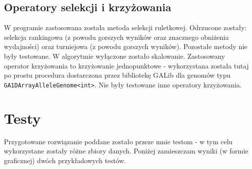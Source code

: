 \documentclass[11pt,a4paper,oneside]{article}
\begin{document}
\subsection{Operatory selekcji i krzyżowania}
W programie zastosowana została metoda selekcji ruletkowej. Odrzucone zostały: selekcja rankingowa (z powodu gorszych wyników oraz znacznego obniżenia wydajności) oraz turniejowa (z powodu gorszych wyników). Pozostałe metody nie były testowane. W algorytmie wyłączone zostało skalowanie. Zastosowany operator krzyżowania to krzyżowanie jednopunktowe - wykorzystana została tutaj po prostu procedura dostarczona przez bibliotekę GALib dla genomów typu \lstinline{GA1DArrayAlleleGenome<int>}. Nie były testowane inne operatory krzyżowania.

\section{Testy}
Przygotowane rozwiązanie poddane zostało przeze mnie testom - w tym celu wykorzystane zostały różne zbiory danych. Poniżej zamieszczam wyniki (w formie graficznej) dwóch przykładowych testów.
\end{document}
